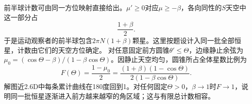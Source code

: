 \documentclass[UTF8,fontset=fandol,a4paper,11pt]{ctexart}
\begin{document}
前半球计数可由同一方位映射直接给出。$\mu'\ge0$对应$\mu\ge-\beta$，各向同性的$S$天空中这一部分占
\[
\frac{1+\beta}{2}.
\]
于是运动观察者的前半球包含$2\pi N(1+\beta)$颗星。这里按题设计入同一批全部恒星，计数由它们的天空方位确定。
对任意固定前方圆锥$\theta'\le\Theta$，边缘静止余弦为$\mu_0=(\cos\Theta-\beta)/(1-\beta\cos\Theta)$。因静止天空均匀，圆锥所占全体星数比例为
\[
F(\Theta)=\frac{1-\mu_0}{2}
=\frac{(1+\beta)(1-\cos\Theta)}{2(1-\beta\cos\Theta)}.
\]
解图近2.6D中每条累计曲线在180度回到1。对任何固定$\Theta>0$，$\beta\to1$时$F\to1$，说明同一批恒星逐渐进入前方越来越窄的角区域；这与有限总计数相容。
\begin{center}\begin{minipage}{.98\linewidth}\centering
{}
\end{minipage}
\end{center}
\end{document}
